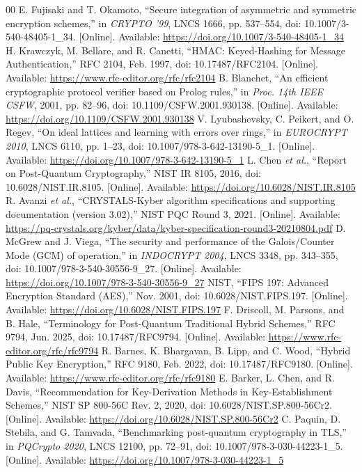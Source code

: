 \documentclass[journal, 10pt]{IEEEtran}
\begin{document}
\begin{thebibliography}{00}
 E. Fujisaki and T. Okamoto, ``Secure integration of asymmetric and symmetric encryption schemes,'' in \textit{CRYPTO '99}, LNCS 1666, pp. 537--554, doi: 10.1007/3-540-48405-1\_34. [Online]. Available: \url{https://doi.org/10.1007/3-540-48405-1_34}
 H. Krawczyk, M. Bellare, and R. Canetti, ``HMAC: Keyed-Hashing for Message Authentication,'' RFC 2104, Feb. 1997, doi: 10.17487/RFC2104. [Online]. Available: \url{https://www.rfc-editor.org/rfc/rfc2104}
 B. Blanchet, ``An efficient cryptographic protocol verifier based on Prolog rules,'' in \textit{Proc. 14th IEEE CSFW}, 2001, pp. 82--96, doi: 10.1109/CSFW.2001.930138. [Online]. Available: \url{https://doi.org/10.1109/CSFW.2001.930138}
 V. Lyubashevsky, C. Peikert, and O. Regev, ``On ideal lattices and learning with errors over rings,'' in \textit{EUROCRYPT 2010}, LNCS 6110, pp. 1--23, doi: 10.1007/978-3-642-13190-5\_1. [Online]. Available: \url{https://doi.org/10.1007/978-3-642-13190-5_1}
 L. Chen \textit{et al.}, ``Report on Post-Quantum Cryptography,'' NIST IR 8105, 2016, doi: 10.6028/NIST.IR.8105. [Online]. Available: \url{https://doi.org/10.6028/NIST.IR.8105}
 R. Avanzi \textit{et al.}, ``CRYSTALS-Kyber algorithm specifications and supporting documentation (version 3.02),'' NIST PQC Round 3, 2021. [Online]. Available: \url{https://pq-crystals.org/kyber/data/kyber-specification-round3-20210804.pdf}
 D. McGrew and J. Viega, ``The security and performance of the Galois/Counter Mode (GCM) of operation,'' in \textit{INDOCRYPT 2004}, LNCS 3348, pp. 343--355, doi: 10.1007/978-3-540-30556-9\_27. [Online]. Available: \url{https://doi.org/10.1007/978-3-540-30556-9_27}
 NIST, ``FIPS 197: Advanced Encryption Standard (AES),'' Nov. 2001, doi: 10.6028/NIST.FIPS.197. [Online]. Available: \url{https://doi.org/10.6028/NIST.FIPS.197}
 F. Driscoll, M. Parsons, and B. Hale, ``Terminology for Post-Quantum Traditional Hybrid Schemes,'' RFC 9794, Jun. 2025, doi: 10.17487/RFC9794. [Online]. Available: \url{https://www.rfc-editor.org/rfc/rfc9794}
 R. Barnes, K. Bhargavan, B. Lipp, and C. Wood, ``Hybrid Public Key Encryption,'' RFC 9180, Feb. 2022, doi: 10.17487/RFC9180. [Online]. Available: \url{https://www.rfc-editor.org/rfc/rfc9180}
 E. Barker, L. Chen, and R. Davis, ``Recommendation for Key-Derivation Methods in Key-Establishment Schemes,'' NIST SP 800-56C Rev. 2, 2020, doi: 10.6028/NIST.SP.800-56Cr2. [Online]. Available: \url{https://doi.org/10.6028/NIST.SP.800-56Cr2}
 C. Paquin, D. Stebila, and G. Tamvada, ``Benchmarking post-quantum cryptography in TLS,'' in \textit{PQCrypto 2020}, LNCS 12100, pp. 72--91, doi: 10.1007/978-3-030-44223-1\_5. [Online]. Available: \url{https://doi.org/10.1007/978-3-030-44223-1_5}

\end{thebibliography}
\end{document}
